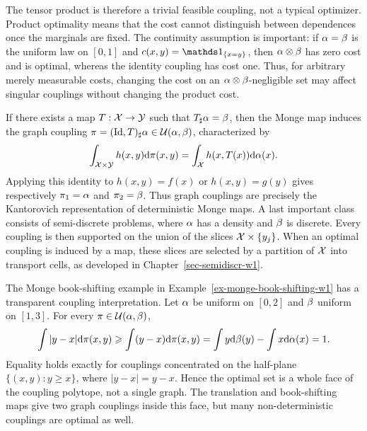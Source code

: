 The tensor product is therefore a trivial feasible coupling, not a typical optimizer. Product optimality means that the cost cannot distinguish between dependences once the marginals are fixed. The continuity assumption is important: if $\alpha=\beta$ is the uniform law on $[0,1]$ and $c(x,y)=\ones_{\{x=y\}}$, then $\alpha\otimes\beta$ has zero cost and is optimal, whereas the identity coupling has cost one. Thus, for arbitrary merely measurable costs, changing the cost on an $\alpha\otimes\beta$-negligible set may affect singular couplings without changing the product cost.

If there exists a map $T:\mathcal{X}\to\mathcal{Y}$ such that $T_\sharp\alpha=\beta$, then the Monge map induces the graph coupling $\pi=(\mathrm{Id},T)_\sharp\alpha\in\mathcal{U}(\alpha,\beta)$, characterized by
\[
	\int_{\mathcal{X}\times\mathcal{Y}} h(x,y)\mathrm{d}\pi(x,y)
	=
	\int_{\mathcal{X}} h(x,T(x))\mathrm{d}\alpha(x).
\]
Applying this identity to $h(x,y)=f(x)$ or $h(x,y)=g(y)$ gives respectively $\pi_1=\alpha$ and $\pi_2=\beta$. Thus graph couplings are precisely the Kantorovich representation of deterministic Monge maps.
A last important class consists of semi-discrete problems, where $\alpha$ has a density and $\beta$ is discrete. Every coupling is then supported on the union of the slices $\mathcal{X}\times\{y_j\}$. When an optimal coupling is induced by a map, these slices are selected by a partition of $\mathcal{X}$ into transport cells, as developed in Chapter~\ref{sec-semidiscr-w1}.

\begin{rem}\label{rem-kantorovich-book-shifting}
	The Monge book-shifting example in Example~\ref{ex-monge-book-shifting-w1} has a transparent coupling interpretation. Let $\alpha$ be uniform on $[0,2]$ and $\beta$ uniform on $[1,3]$. For every $\pi\in\mathcal{U}(\alpha,\beta)$,
	\[
		\int |y-x|\mathrm{d}\pi(x,y)
		\geqslant
		\int (y-x)\mathrm{d}\pi(x,y)
		=
		\int y\mathrm{d}\beta(y)-\int x\mathrm{d}\alpha(x)
		=1.
	\]
	Equality holds exactly for couplings concentrated on the half-plane $\{(x,y):y\geq x\}$, where $|y-x|=y-x$. Hence the optimal set is a whole face of the coupling polytope, not a single graph. The translation and book-shifting maps give two graph couplings inside this face, but many non-deterministic couplings are optimal as well.
\end{rem}

